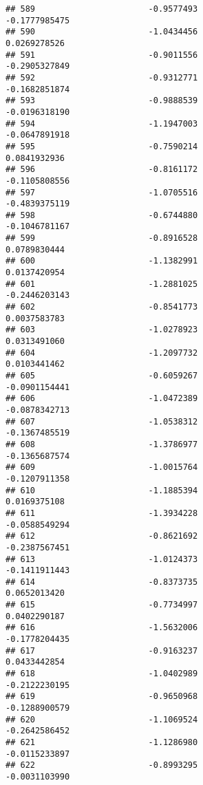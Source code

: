 \documentclass[
]{article}
\begin{document}
\begin{verbatim}
## 589                       -0.9577493                         -0.1777985475
## 590                       -1.0434456                          0.0269278526
## 591                       -0.9011556                         -0.2905327849
## 592                       -0.9312771                         -0.1682851874
## 593                       -0.9888539                         -0.0196318190
## 594                       -1.1947003                         -0.0647891918
## 595                       -0.7590214                          0.0841932936
## 596                       -0.8161172                         -0.1105808556
## 597                       -1.0705516                         -0.4839375119
## 598                       -0.6744880                         -0.1046781167
## 599                       -0.8916528                          0.0789830444
## 600                       -1.1382991                          0.0137420954
## 601                       -1.2881025                         -0.2446203143
## 602                       -0.8541773                          0.0037583783
## 603                       -1.0278923                          0.0313491060
## 604                       -1.2097732                          0.0103441462
## 605                       -0.6059267                         -0.0901154441
## 606                       -1.0472389                         -0.0878342713
## 607                       -1.0538312                         -0.1367485519
## 608                       -1.3786977                         -0.1365687574
## 609                       -1.0015764                         -0.1207911358
## 610                       -1.1885394                          0.0169375108
## 611                       -1.3934228                         -0.0588549294
## 612                       -0.8621692                         -0.2387567451
## 613                       -1.0124373                         -0.1411911443
## 614                       -0.8373735                          0.0652013420
## 615                       -0.7734997                          0.0402290187
## 616                       -1.5632006                         -0.1778204435
## 617                       -0.9163237                          0.0433442854
## 618                       -1.0402989                         -0.2122230195
## 619                       -0.9650968                         -0.1288900579
## 620                       -1.1069524                         -0.2642586452
## 621                       -1.1286980                         -0.0115233897
## 622                       -0.8993295                         -0.0031103990

\end{verbatim}
\end{document}
